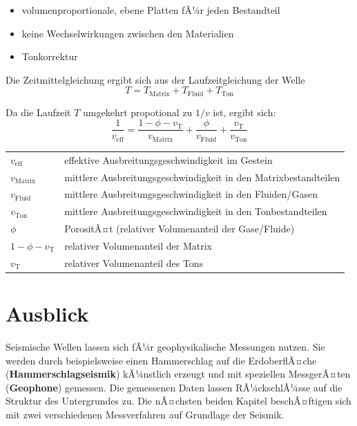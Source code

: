 \begin{itemize}
	\item volumenproportionale, ebene Platten fÃ¼r jeden Bestandteil
	\item keine Wechselwirkungen zwischen den Materialien
	\item Tonkorrektur
\end{itemize}

Die Zeitmittelgleichung ergibt sich aus der Laufzeitgleichung der Welle \begin{equation*}
	T = T_{\text{Matrix}} + T_{\text{Fluid}} + T_{\text{Ton}}
\end{equation*}

Da die Laufzeit $T$ umgekehrt propotional zu $1/v$ ist, ergibt sich: \begin{equation*}
	\frac{1}{v_{\text{eff}}} = \frac{1 - \phi - v_{\text{T}}}{v_{\text{Matrix}}} + \frac{\phi}{v_{\text{Fluid}}} + \frac{v_{\text{T}}}{v_{\text{Ton}}}
\end{equation*}

\begin{tabular}{ll}
	$v_{\text{eff}}$ & effektive Ausbreitungsgeschwindigkeit im Gestein \\
	$v_{\text{Matrix}}$ & mittlere Ausbreitungsgeschwindigkeit in den Matrixbestandteilen \\
	$v_{\text{Fluid}}$ & mittlere Ausbreitungsgeschwindigkeit in den Fluiden/Gasen \\
	$v_{\text{Ton}}$ & mittlere Ausbreitungsgeschwindigkeit in den Tonbestandteilen \\
	$\phi$ & PorositÃ¤t (relativer Volumenanteil der Gase/Fluide) \\
	$1 - \phi - v_{\text{T}}$ & relativer Volumenanteil der Matrix \\
	$v_{\text{T}}$ & relativer Volumenanteil des Tons
\end{tabular}

\section{Ausblick}
Seismische Wellen lassen sich fÃ¼r geophysikalische Messungen nutzen. Sie werden durch beispielsweise einen Hammerschlag auf die ErdoberflÃ¤che (\textbf{Hammerschlagseismik}) kÃ¼nstlich erzeugt und mit speziellen MessgerÃ¤ten (\textbf{Geophone}) gemessen. Die gemessenen Daten lassen RÃ¼ckschlÃ¼sse auf die Struktur des Untergrundes zu. Die nÃ¤chsten beiden Kapitel beschÃ¤ftigen sich mit zwei verschiedenen Messverfahren auf Grundlage der Seismik.  





